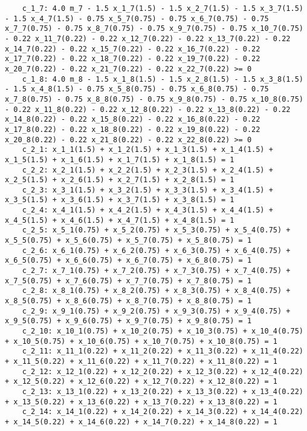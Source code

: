 \documentclass{article}[A4]
\begin{document}
\begin{lstlisting}
	c_1_7: 4.0 m_7 - 1.5 x_1_7(1.5) - 1.5 x_2_7(1.5) - 1.5 x_3_7(1.5) - 1.5 x_4_7(1.5) - 0.75 x_5_7(0.75) - 0.75 x_6_7(0.75) - 0.75 x_7_7(0.75) - 0.75 x_8_7(0.75) - 0.75 x_9_7(0.75) - 0.75 x_10_7(0.75) - 0.22 x_11_7(0.22) - 0.22 x_12_7(0.22) - 0.22 x_13_7(0.22) - 0.22 x_14_7(0.22) - 0.22 x_15_7(0.22) - 0.22 x_16_7(0.22) - 0.22 x_17_7(0.22) - 0.22 x_18_7(0.22) - 0.22 x_19_7(0.22) - 0.22 x_20_7(0.22) - 0.22 x_21_7(0.22) - 0.22 x_22_7(0.22) >= 0
	c_1_8: 4.0 m_8 - 1.5 x_1_8(1.5) - 1.5 x_2_8(1.5) - 1.5 x_3_8(1.5) - 1.5 x_4_8(1.5) - 0.75 x_5_8(0.75) - 0.75 x_6_8(0.75) - 0.75 x_7_8(0.75) - 0.75 x_8_8(0.75) - 0.75 x_9_8(0.75) - 0.75 x_10_8(0.75) - 0.22 x_11_8(0.22) - 0.22 x_12_8(0.22) - 0.22 x_13_8(0.22) - 0.22 x_14_8(0.22) - 0.22 x_15_8(0.22) - 0.22 x_16_8(0.22) - 0.22 x_17_8(0.22) - 0.22 x_18_8(0.22) - 0.22 x_19_8(0.22) - 0.22 x_20_8(0.22) - 0.22 x_21_8(0.22) - 0.22 x_22_8(0.22) >= 0
	c_2_1: x_1_1(1.5) + x_1_2(1.5) + x_1_3(1.5) + x_1_4(1.5) + x_1_5(1.5) + x_1_6(1.5) + x_1_7(1.5) + x_1_8(1.5) = 1
	c_2_2: x_2_1(1.5) + x_2_2(1.5) + x_2_3(1.5) + x_2_4(1.5) + x_2_5(1.5) + x_2_6(1.5) + x_2_7(1.5) + x_2_8(1.5) = 1
	c_2_3: x_3_1(1.5) + x_3_2(1.5) + x_3_3(1.5) + x_3_4(1.5) + x_3_5(1.5) + x_3_6(1.5) + x_3_7(1.5) + x_3_8(1.5) = 1
	c_2_4: x_4_1(1.5) + x_4_2(1.5) + x_4_3(1.5) + x_4_4(1.5) + x_4_5(1.5) + x_4_6(1.5) + x_4_7(1.5) + x_4_8(1.5) = 1
	c_2_5: x_5_1(0.75) + x_5_2(0.75) + x_5_3(0.75) + x_5_4(0.75) + x_5_5(0.75) + x_5_6(0.75) + x_5_7(0.75) + x_5_8(0.75) = 1
	c_2_6: x_6_1(0.75) + x_6_2(0.75) + x_6_3(0.75) + x_6_4(0.75) + x_6_5(0.75) + x_6_6(0.75) + x_6_7(0.75) + x_6_8(0.75) = 1
	c_2_7: x_7_1(0.75) + x_7_2(0.75) + x_7_3(0.75) + x_7_4(0.75) + x_7_5(0.75) + x_7_6(0.75) + x_7_7(0.75) + x_7_8(0.75) = 1
	c_2_8: x_8_1(0.75) + x_8_2(0.75) + x_8_3(0.75) + x_8_4(0.75) + x_8_5(0.75) + x_8_6(0.75) + x_8_7(0.75) + x_8_8(0.75) = 1
	c_2_9: x_9_1(0.75) + x_9_2(0.75) + x_9_3(0.75) + x_9_4(0.75) + x_9_5(0.75) + x_9_6(0.75) + x_9_7(0.75) + x_9_8(0.75) = 1
	c_2_10: x_10_1(0.75) + x_10_2(0.75) + x_10_3(0.75) + x_10_4(0.75) + x_10_5(0.75) + x_10_6(0.75) + x_10_7(0.75) + x_10_8(0.75) = 1
	c_2_11: x_11_1(0.22) + x_11_2(0.22) + x_11_3(0.22) + x_11_4(0.22) + x_11_5(0.22) + x_11_6(0.22) + x_11_7(0.22) + x_11_8(0.22) = 1
	c_2_12: x_12_1(0.22) + x_12_2(0.22) + x_12_3(0.22) + x_12_4(0.22) + x_12_5(0.22) + x_12_6(0.22) + x_12_7(0.22) + x_12_8(0.22) = 1
	c_2_13: x_13_1(0.22) + x_13_2(0.22) + x_13_3(0.22) + x_13_4(0.22) + x_13_5(0.22) + x_13_6(0.22) + x_13_7(0.22) + x_13_8(0.22) = 1
	c_2_14: x_14_1(0.22) + x_14_2(0.22) + x_14_3(0.22) + x_14_4(0.22) + x_14_5(0.22) + x_14_6(0.22) + x_14_7(0.22) + x_14_8(0.22) = 1

\end{lstlisting}
\end{document}
